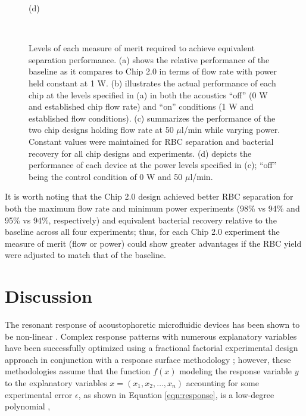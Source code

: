\begin{figure}[H]
\begin{minipage}[t]{0.49\linewidth}
    \medskip
    \centerline{(d)}
  \end{minipage}\\
  \caption[Bacterial separation performance comparison]{Levels of each measure of merit required to achieve equivalent separation performance. (a) shows the relative performance of the baseline as it compares to Chip 2.0 in terms of flow rate with power held constant at 1 W. (b) illustrates the actual performance of each chip at the levels specified in (a) in both the acoustics ``off'' (0 W and established chip flow rate) and ``on'' conditions (1 W and established flow conditions). (c) summarizes the performance of the two chip designs holding flow rate at 50 $\mu$l/min while varying power. Constant values were maintained for RBC separation and bacterial recovery for all chip designs and experiments. (d) depicts the performance of each device at the power levels specified in (c); ``off'' being the control condition of 0 W and 50 $\mu$l/min.}
	\label{fig:bacPerf}
\end{figure}



It is worth noting that the Chip 2.0 design achieved better RBC separation  for both the maximum flow rate and minimum power experiments (98\% vs 94\% and 95\% vs 94\%, respectively) and equivalent bacterial recovery relative to the baseline across all four experiments; thus, for each Chip 2.0 experiment the measure of merit (flow or power) could show greater advantages if the RBC yield were adjusted to match that of the baseline. 


\section{Discussion}
\label{sec:discussion}

The resonant response of acoustophoretic microfluidic devices has been shown to be non-linear \cite{garofalo2016performance}\cite{bora2015efficient}\cite{glynne2009new}\cite{hahn2014modeling}. Complex response patterns with numerous explanatory variables have been successfully optimized using a fractional factorial experimental design approach in conjunction with a response surface methodology \cite{khuri2010response}; however, these methodologies assume that the function $f(x)$ modeling the response variable $y$ to the explanatory variables $x=(x_1,x_2,\dots,x_n)$ accounting for some experimental error $\epsilon$, as shown in Equation \ref{eqn:response}, is a low-degree polynomial \cite{khuri2010response}, 

